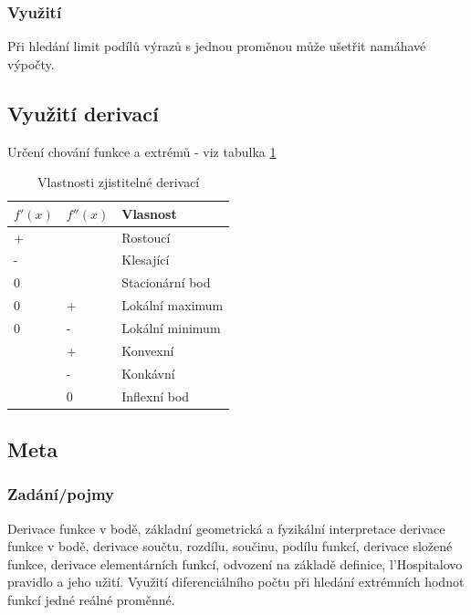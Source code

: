 \documentclass[12pt]{article}
\begin{document}
\subsubsection{Využití}
Při hledání limit podílů výrazů s jednou proměnou může ušetřit namáhavé výpočty.
\subsection{Využití derivací}
\label{sec:vyuziti_derivaci}
Určení chování funkce a extrémů - viz tabulka \ref{table:vlastnosti} 
\begin{table}[h!]
\centering
\begin{tabular}{|l|l|l|}
\hline
$f'(x)$ & $f''(x)$ & Vlasnost        \\ \hline
+       &          & Rostoucí        \\ \hline
-       &          & Klesající       \\ \hline
0       &          & Stacionární bod \\ \hline
0       & +        & Lokální maximum \\ \hline
0       & -        & Lokální minimum \\ \hline
        & +        & Konvexní        \\ \hline
        & -       & Konkávní        \\ \hline
        & 0        & Inflexní bod    \\ \hline
\end{tabular}
\caption{Vlastnosti zjistitelné derivací}
\label{table:vlastnosti}
\end{table}
\subsection{Meta}
\subsubsection{Zadání/pojmy}
Derivace funkce v bodě, základní geometrická a fyzikální interpretace derivace funkce v bodě, derivace součtu, rozdílu, součinu, podílu funkcí, derivace složené funkce, derivace elementárních funkcí, odvození na základě definice, l'Hospitalovo pravidlo a jeho užití. Využití diferenciálního počtu při hledání extrémních hodnot funkcí jedné reálné proměnné.
\end{document}
